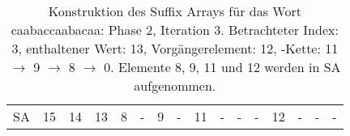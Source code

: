 \begin{table}[H]
\begin{adjustbox}{max width=\textwidth}
\begin{tabular}{lccccccccccccccc}
\multicolumn{1}{l|}{SA}      & \multicolumn{1}{c|}{15} & 14 & \multicolumn{1}{c|}{\cellcolor[HTML]{\green}13} & \multicolumn{1}{c|}{\cellcolor[HTML]{\red}8} & \multicolumn{1}{c|}{-}      & \multicolumn{1}{c|}{\cellcolor[HTML]{\red}9} & \multicolumn{1}{c|}{-}     & \multicolumn{1}{c|}{\cellcolor[HTML]{\red}11} & \multicolumn{1}{c|}{-}   & -  & \multicolumn{1}{c|}{-}  & \cellcolor[HTML]{\red}12 & -  & -  & - 
\end{tabular}
\end{adjustbox}

\caption[Konstruktion des Suffix Arrays f{\"u}r das Wort caabaccaabacaa: Phase 2, Iteration 3]{Konstruktion des Suffix Arrays f{\"u}r das Wort caabaccaabacaa: Phase 2, Iteration 3. Betrachteter Index: 3, enthaltener Wert: 13, Vorg{\"a}ngerelement: 12, \prevpointer-Kette: 11 $\rightarrow$ 9 $\rightarrow$ 8 $\rightarrow$ 0. Elemente 8, 9, 11 und 12 werden in SA aufgenommen.}
\label{table_complex_example_2_3} 
\end{table}

